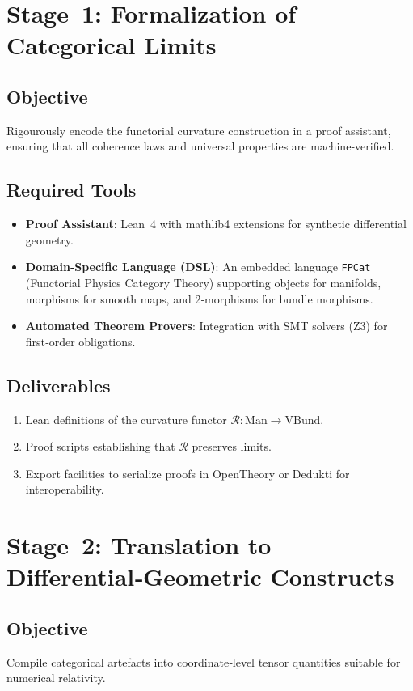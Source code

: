 \documentclass[11pt]{article}
\begin{document}
\section{Stage 1: Formalization of Categorical Limits}
\subsection{Objective}
Rigourously encode the functorial curvature construction in a proof assistant, ensuring that all coherence laws and universal properties are machine‑verified.

\subsection{Required Tools}
\begin{itemize}
  \item \textbf{Proof Assistant}: Lean~4 with mathlib4 extensions for synthetic differential geometry.
  \item \textbf{Domain‑Specific Language (DSL)}: An embedded language \texttt{FPCat} (Functorial Physics Category Theory) supporting objects for manifolds, morphisms for smooth maps, and 2‑morphisms for bundle morphisms.
  \item \textbf{Automated Theorem Provers}: Integration with SMT solvers (Z3) for first‑order obligations.
\end{itemize}

\subsection{Deliverables}
\begin{enumerate}
  \item Lean definitions of the curvature functor \(\mathcal{R}:\mathrm{Man}\to\mathrm{VBund}\).
  \item Proof scripts establishing that \(\mathcal{R}\) preserves limits.
  \item Export facilities to serialize proofs in OpenTheory or Dedukti for interoperability.
\end{enumerate}

\section{Stage 2: Translation to Differential‑Geometric Constructs}
\subsection{Objective}
Compile categorical artefacts into coordinate‑level tensor quantities suitable for numerical relativity.
\end{document}
